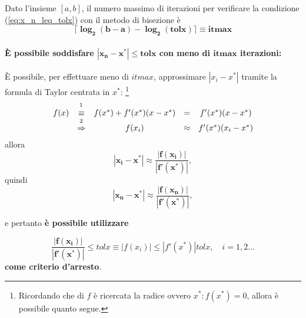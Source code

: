 
\begin{definition}\label{def:itmax_metodo_bisezione}
	Dato l'insieme $[a,b]$, il numero massimo di iterazioni per verificare la condizione (\ref{eq:x_n_leq_tolx}) con il metodo di bisezione è
	\begin{equation*}
		\boldsymbol{\lceil \log_{2}(b-a)-\log_{2}(tolx)\rceil \equiv itmax}
	\end{equation*}
\end{definition}

\paragraph{È possibile soddisfare $\boldsymbol{|x_n-x^*|\leq tolx}$ con meno di $\boldsymbol{itmax}$ iterazioni:}
È possibile, per effettuare meno di $itmax$, approssimare $|x_i-x^*|$ tramite la formula di Taylor centrata in $x^*$:
\footnote{Ricordando che di $f$ è ricercata la radice ovvero $x^*:f(x^*)=0$, allora è possibile quanto segue.}
\begin{equation}\label{eq:approsimazione_taylor_f_xstar}
	\begin{matrix}
		f(x)&\overset{\footnotemark}{\equiv}& f(x^*)+f'(x^*)(x-x^*)&=&f'(x^*)(x-x^*)\\
		&\overset{\footnotemark}{\Rightarrow}&f(x_i)&\approx& f'(x^*)(x_i-x^*)
	\end{matrix}
\end{equation}
\footnotemark  allora
\begin{equation*}
	\boldsymbol{|x_i-x^*| \approx \frac{|f(x_i)|}{|f'(x^*)|}},
\end{equation*}
quindi
\begin{equation*}
	\boldsymbol{|x_n-x^*| \approx \frac{|f(x_n)|}{|f'(x^*)|}},
\end{equation*}

\addtocounter{footnote}{-2}



\noindent e pertanto \textbf{è possibile utilizzare}

\begin{equation}\label{eq:criterio_arresto_aggiornato_bisezione}
	\boldsymbol{\frac{|f(x_i)|}{|f'(x^*)|}}\leq tolx\equiv  |f(x_i)|\leq|f'(x^*)|tolx,\quad i = 1,2\hdots 
\end{equation}
\textbf{come criterio d'arresto}. 

